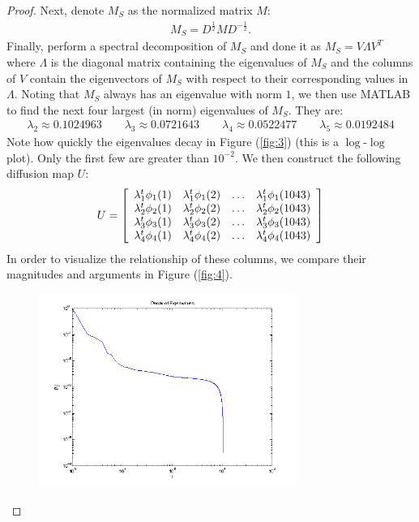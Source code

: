 \documentclass{article} %
\theoremstyle{plain}
\numberwithin{equation}{section} %
\numberwithin{figure}{section} %
\numberwithin{table}{section} %
\begin{document}
\begin{proof}
    Next, denote $M_S$ as the normalized matrix $M$:
    \begin{align*}
        M_S = D^{\frac{1}{2}}MD^{-\frac{1}{2}}.
    \end{align*}
    Finally, perform a spectral decomposition of $M_S$ and done it as $M_S = V\Lambda V^T$ where $\Lambda$ is the diagonal matrix containing the eigenvalues of $M_S$ and the columns of $V$ contain the eigenvectors of $M_S$ with respect to their corresponding values in $\Lambda$.  Noting that $M_S$ always has an eigenvalue with norm $1$, we then use MATLAB to find the next four largest (in norm) eigenvalues of $M_S$.  They are:
    \begin{align*}
        \lambda_2 \approx 0.1024963 \qquad \lambda_3 \approx 0.0721643 \qquad \lambda_4 \approx 0.0522477 \qquad \lambda_5 \approx 0.0192484
    \end{align*}
    Note how quickly the eigenvalues decay in Figure (\ref{fig:3}) (this is a $\log$-$\log$ plot).  Only the first few are greater than $10^{-2}$.  We then construct the following diffusion map $U$:
    \begin{align*}
        U = \qty[\begin{array}{cccc}
            \lambda_1^t\phi_1(1) & \lambda_1^t\phi_1(2) & \dots & \lambda_1^t\phi_1(1043) \\
            \lambda_2^t\phi_2(1) & \lambda_2^t\phi_2(2) & \dots & \lambda_2^t\phi_2(1043) \\
            \lambda_3^t\phi_3(1) & \lambda_3^t\phi_3(2) & \dots & \lambda_3^t\phi_3(1043) \\
            \lambda_4^t\phi_4(1) & \lambda_4^t\phi_4(2) & \dots & \lambda_4^t\phi_4(1043) 
        \end{array}]
    \end{align*}
    In order to visualize the relationship of these columns, we compare their magnitudes and arguments in Figure (\ref{fig:4}).
    \begin{figure}[ht!]
        \centering
        \includegraphics[width=0.75\textwidth]{evals.png}

\end{figure}
\end{proof}
\end{document}
